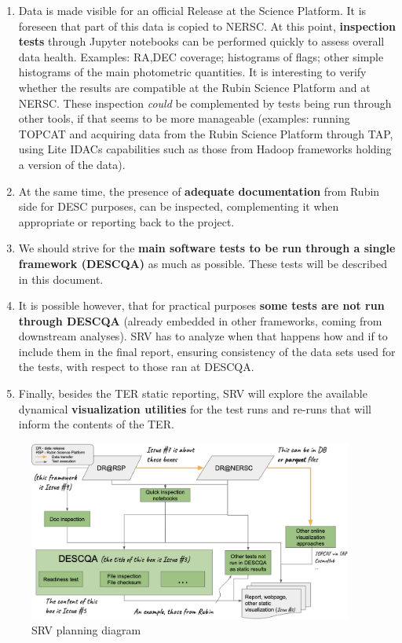 \documentclass[12pt, a4paper]{article}
\begin{document}
\begin{enumerate}
	\item Data is made visible for an official Release at the Science Platform. It is foreseen that part of this data is copied to NERSC. At this point, \textbf{inspection tests} through Jupyter notebooks can be performed quickly to assess overall data health. Examples: RA,DEC coverage; histograms of flags; other simple histograms of the main photometric quantities. It is interesting to verify whether the results are compatible at the Rubin Science Platform and at NERSC. These inspection \textit{could} be complemented by tests being run through other tools, if that seems to be more manageable (examples: running TOPCAT and acquiring data from the Rubin Science Platform through TAP, using Lite IDACs capabilities such as those from Hadoop frameworks holding a version of the data).
	\item At the same time, the presence of \textbf{adequate documentation} from Rubin side for DESC purposes, can be inspected, complementing it when appropriate or reporting back to the project.
	\item We should strive for the \textbf{main software tests to be run through a single framework (DESCQA)} as much as possible. These tests will be described in this document.
	\item It is possible however, that for practical purposes \textbf{some tests are not run through DESCQA} (already embedded in other frameworks, coming from downstream analyses). SRV has to analyze when that happens how and if to include them in the final report, ensuring consistency of the data sets used for the tests, with respect to those ran at DESCQA.
	\item Finally, besides the TER static reporting, SRV will explore the available dynamical \textbf{visualization utilities} for the test runs and re-runs that will inform the contents of the TER.
\end{enumerate}

\begin{figure}[h]
\begin{center}
\includegraphics[width=0.95\textwidth]{../SRV_planning_diagram.png} 
\caption{SRV planning diagram}
\label{fig:srvplanning}
\end{center}
\end{figure}
\end{document}
